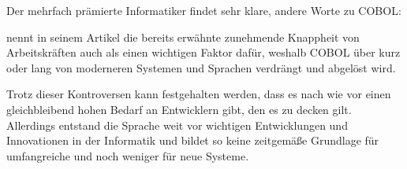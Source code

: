 Der mehrfach prämierte Informatiker \citeauthor{edsger_wybe_dijkstra_how_1975} \zB findet sehr klare, andere Worte zu COBOL:  \cite{edsger_wybe_dijkstra_how_1975}

\citeauthor{florian_hamann_banken_2017} nennt in seinem Artikel  die bereits erwähnte zunehmende Knappheit von Arbeitskräften auch als einen wichtigen Faktor dafür, weshalb COBOL über kurz oder lang von moderneren Systemen und Sprachen verdrängt und abgelöst wird.

Trotz dieser Kontroversen kann festgehalten werden, dass es nach wie vor einen gleichbleibend hohen Bedarf an Entwicklern gibt, den es zu decken gilt. Allerdings entstand die Sprache weit vor wichtigen Entwicklungen und Innovationen in der Informatik und bildet so keine zeitgemäße Grundlage für umfangreiche und noch weniger für neue Systeme.